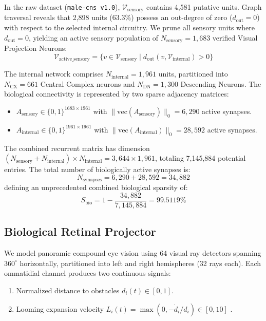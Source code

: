 \documentclass{article}
\begin{document}
In the raw dataset (\texttt{male-cns v1.0}), $\mathcal{V}_{\text{sensory}}$ contains 4,581 putative units. Graph traversal reveals that 2,898 units (63.3\%) possess an out-degree of zero ($d_{\text{out}} = 0$) with respect to the selected internal circuitry. We prune all sensory units where $d_{\text{out}} = 0$, yielding an active sensory population of $N_{\text{sensory}} = 1,683$ verified Visual Projection Neurons:
\begin{equation}
\mathcal{V}_{\text{active\_sensory}} = \{v \in \mathcal{V}_{\text{sensory}} \mid d_{\text{out}}(v, \mathcal{V}_{\text{internal}}) > 0\}
\end{equation}

The internal network comprises $N_{\text{internal}} = 1,961$ units, partitioned into $N_{\text{CX}} = 661$ Central Complex neurons and $N_{\text{DN}} = 1,300$ Descending Neurons. The biological connectivity is represented by two sparse adjacency matrices:
\begin{itemize}
    \item $A_{\text{sensory}} \in \{0, 1\}^{1683 \times 1961}$ with $\|\text{vec}(A_{\text{sensory}})\|_0 = 6,290$ active synapses.
    \item $A_{\text{internal}} \in \{0, 1\}^{1961 \times 1961}$ with $\|\text{vec}(A_{\text{internal}})\|_0 = 28,592$ active synapses.
\end{itemize}

The combined recurrent matrix has dimension $(N_{\text{sensory}} + N_{\text{internal}}) \times N_{\text{internal}} = 3,644 \times 1,961$, totaling 7,145,884 potential entries. The total number of biologically active synapses is:
\begin{equation}
N_{\text{synapses}} = 6,290 + 28,592 = 34,882
\end{equation}
defining an unprecedented combined biological sparsity of:
\begin{equation}
S_{\text{bio}} = 1 - \frac{34,882}{7,145,884} = 99.5119\%
\end{equation}

\subsection{Biological Retinal Projector}
We model panoramic compound eye vision using 64 visual ray detectors spanning $360^{\circ}$ horizontally, partitioned into left and right hemispheres (32 rays each). Each ommatidial channel produces two continuous signals:
\begin{enumerate}
    \item Normalized distance to obstacles $d_i(t) \in [0, 1]$.
    \item Looming expansion velocity $L_i(t) = \max(0, -\dot{d}_i / d_i) \in [0, 10]$ \cite{klapoetke2017ultra}.
\end{enumerate}
\end{document}
